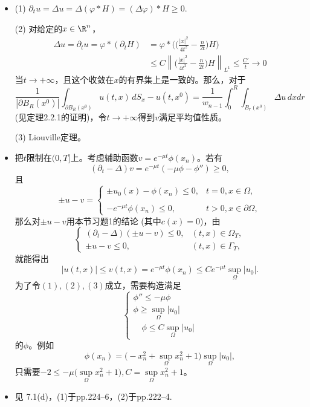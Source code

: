\begin{itemize}
\item[8.] (1) $\partial_tu=\Delta u=\Delta(\varphi*H)=(\Delta\varphi)*H\geqslant0$.

(2) 对给定的$x\in\R^n$，
\begin{align*}
    \Delta u=\partial_t u=\varphi*(\partial_tH)
    &=\varphi*\Big(\Big(\frac{|x|^2}{4t^2}-\frac{n}{2t}\Big)H\Big)\\
    &\leqslant C\left\|\Big(\frac{|x|^2}{4t^2}-\frac{n}{2t}\Big)H\right\|_{L^1}
    \leqslant\frac{C'}{t}\rightarrow0
\end{align*}
当$t\rightarrow+\infty$，且这个收敛在$x$的有界集上是一致的。那么，对于
$$\frac{1}{|\partial B_R(x^0)|}\int_{\partial B_R(x^0)}u(t,x)\,dS_x-u(t,x^0)
=\frac{1}{w_{n-1}}\int_0^R\int_{B_r(x^0)}\Delta u\,dxdr$$
(见定理2.2.1的证明)，令$t\rightarrow+\infty$得到$v$满足平均值性质。

(3) Liouville定理。

\item[9.] 把$t$限制在$(0,T]$上。考虑辅助函数$v=e^{-\mu t}\phi(x_n)$。若有
\[(\partial_t-\Delta)v=e^{-\mu t}(-\mu\phi-\phi'')\geqslant0,\tag{1}\]
且
\[\pm u-v=\begin{cases}
    \pm u_0(x)-\phi(x_n)\leqslant0, & t=0,x\in\varOmega,\\ \\
    -e^{-\mu t}\phi(x_n)\leqslant0, & t>0,x\in\partial\varOmega,\tag{2}
\end{cases}\]
那么对$\pm u-v$用本节习题1的结论 (其中$c(x)=0$)，由
\[\begin{cases}
    (\partial_t-\Delta)(\pm u-v)\leqslant0,&(t,x)\in\varOmega_T,\\
    \pm u-v\leqslant0,&(t,x)\in\varGamma_T,
\end{cases}\]
就能得出
\[|u(t,x)|\leqslant v(t,x)=e^{-\mu t}\phi(x_n)
\leqslant Ce^{-\mu t}\sup_\varOmega|u_0|.\tag{3}\]
为了令$(1),(2),(3)$成立，需要构造满足
\[\left\{\begin{matrix}
    \!\!\!\!\!\!\!\!\!\!\!\!\phi''\leqslant-\mu\phi\\
    \!\!\phi\geqslant\sup\limits_\varOmega|u_0|\\
    \!\!\quad\phi\leqslant C\sup\limits_\varOmega|u_0|
\end{matrix}\right.\]
的$\phi$。例如
\[\phi(x_n)=\big(\!-x_n^2+\sup_\varOmega x_n^2+1\big)\sup_\varOmega|u_0|,\]
只需要$-2\leqslant-\mu\big(\sup\limits_\varOmega x_n^2+1\big),C=\sup\limits_\varOmega x_n^2+1$。

\item[10.]
见\cite{John} 7.1(d)，(1)于pp.224--6，(2)于pp.222--4.
\end{itemize}

